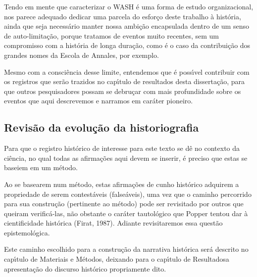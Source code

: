 \documentclass[
12pt,		%
openright,	%
twoside,  %
a4paper,			%
chapter=TITLE,		%
english,			%
french,				%
spanish,			%
brazil				%
]{USPSC-classe/USPSC}
\begin{document}
Tendo em mente que caracterizar o WASH \'e uma forma de estudo organizacional, nos parece adequado dedicar uma parcela do esfor\c{c}o deste trabalho \`a hist\'oria, ainda que seja necess\'ario manter nossa ambi\c{c}\~ao encapsulada dentro de um senso de auto-limita\c{c}\~ao, porque tratamos de eventos muito recentes, sem um compromisso com a hist\'oria de longa dura\c{c}\~ao, como \'e o caso da contribui\c{c}\~ao dos grandes nomes da Escola de Annales, por exemplo.










Mesmo com a consci\^encia desse limite, entendemos que \'e poss\'{\i}vel contribuir com os registros que ser\~ao trazidos no cap\'{\i}tulo de resultados desta disserta\c{c}\~ao, para que outros pesquisadores possam se debru\c{c}ar com mais profundidade sobre os eventos que aqui descrevemos e narramos em car\'ater pioneiro.










\subsection[Revis\~ao da evolu\c{c}\~ao da historiografia]{Revis\~ao da evolu\c{c}\~ao da historiografia}\label{Revis\~ao da evolu\c{c}\~ao da historiografia}
Para que o registro hist\'orico de interesse para este texto se d\^e no contexto da ci\^encia, no qual todas as afirma\c{c}\~oes aqui devem se inserir, \'e preciso que estas se baseiem em um m\'etodo.










Ao se basearem num m\'etodo, estas afirma\c{c}\~oes de cunho hist\'orico adquirem a propriedade de serem contest\'aveis (false\'aveis), uma vez que o caminho percorrido para sua constru\c{c}\~ao (pertinente ao m\'etodo) pode ser revisitado por outros que queiram verific\'a-las, n\~ao obstante o car\'ater tautol\'ogico que Popper tentou dar \`a cientificidade hist\'orica  (Firat, 1987). Adiante revisitaremos essa quest\~ao epistemol\'ogica.










Este caminho escolhido para a constru\c{c}\~ao da narrativa hist\'orica ser\'a descrito no cap\'{\i}tulo de \textquotedbl Materiais e M\'etodos\textquotedbl , deixando para o cap\'{\i}tulo de \textquotedbl Resultados\textquotedbl  a apresenta\c{c}\~ao do discurso hist\'orico propriamente dito.
\end{document}
